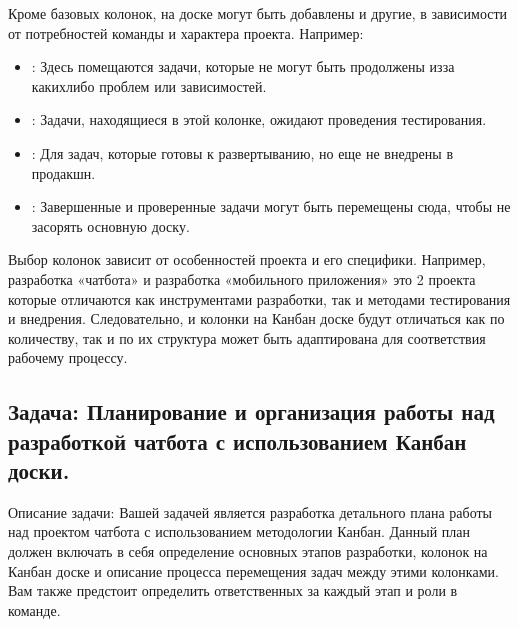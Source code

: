 \documentclass[letterpaper,10pt,russian]{sphinxmanual}
\begin{document}
\sphinxAtStartPar
Кроме базовых колонок, на доске могут быть добавлены и другие, в зависимости от потребностей команды и характера проекта. Например:
\begin{itemize}
\item {} 
\sphinxAtStartPar
{}: Здесь помещаются задачи, которые не могут быть продолжены из\sphinxhyphen{}за каких\sphinxhyphen{}либо проблем или зависимостей.

\item {} 
\sphinxAtStartPar
{}: Задачи, находящиеся в этой колонке, ожидают проведения тестирования.

\item {} 
\sphinxAtStartPar
{}: Для задач, которые готовы к развертыванию, но еще не внедрены в продакшн.

\item {} 
\sphinxAtStartPar
{}: Завершенные и проверенные задачи могут быть перемещены сюда, чтобы не засорять основную доску.

\end{itemize}

\sphinxAtStartPar
Выбор колонок зависит от особенностей проекта и его специфики. Например, разработка «чат\sphinxhyphen{}бота» и разработка «мобильного приложения» это 2 проекта которые отличаются как инструментами разработки, так и методами тестирования и внедрения. Следовательно, и колонки на Канбан доске будут отличаться как по количеству, так и по  их структура может быть адаптирована для соответствия рабочему процессу.


\subsection{Задача: Планирование и организация работы над разработкой чат\sphinxhyphen{}бота с использованием Канбан доски.}
\label{\detokenize{educational_materials/team_work_on_a_project/content:id2}}
\sphinxAtStartPar
Описание задачи: Вашей задачей является разработка детального плана работы над проектом чат\sphinxhyphen{}бота с использованием методологии Канбан. Данный план должен включать в себя определение основных этапов разработки, колонок на Канбан доске и описание процесса перемещения задач между этими колонками. Вам также предстоит определить ответственных за каждый этап и роли в команде.
\end{document}
